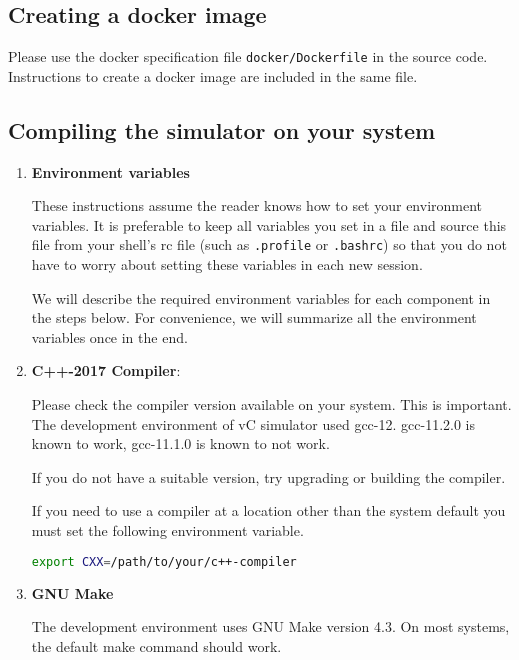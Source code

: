 \documentclass[12pt,a4paper]{article}
\begin{document}
\subsection{Creating a docker image}

Please use the docker specification file \texttt{docker/Dockerfile} in the source code. Instructions to create a docker image are included in the same file.


\subsection{Compiling the simulator on your system}

\begin{enumerate}

\item \textbf{Environment variables}

These instructions assume the reader knows how to set your environment variables. It is preferable to keep all variables you set in a file and source this file from your shell's rc file (such as \texttt{.profile} or \texttt{.bashrc}) so that you do not have to worry about setting these variables in each new session.

We will describe the required environment variables for each component in the steps below. For convenience, we will summarize all the environment variables once in the end.

\item \textbf{C++-2017 Compiler}:

Please check the compiler version available on your system. This is important. The development environment of vC simulator used gcc-12. gcc-11.2.0 is known to work, gcc-11.1.0 is known to not work.

If you do not have a suitable version, try upgrading or building the compiler.

If you need to use a compiler at a location other than the system default you must set the following environment variable.

\begin{lstlisting}[language=bash,style=snippet]
export CXX=/path/to/your/c++-compiler
\end{lstlisting}

\item \textbf{GNU Make}

The development environment uses GNU Make version 4.3. On most systems, the default make command should work.


\end{enumerate}
\end{document}
